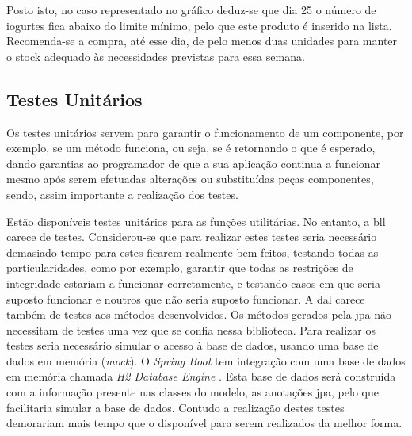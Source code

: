 Posto isto, no caso representado no gráfico deduz-se que dia 25 o número de iogurtes fica abaixo do limite mínimo, pelo que este produto é inserido na lista. Recomenda-se a compra, até esse dia, de pelo menos duas unidades para manter o stock adequado às necessidades previstas para essa semana.



\subsection{Testes Unitários}\label{subsec354}

Os testes unitários servem para garantir o funcionamento de um componente, por exemplo, se um método funciona, ou seja,  se é retornando o que é esperado, dando garantias ao programador de que a sua aplicação continua a funcionar mesmo após serem efetuadas alterações ou substituídas peças componentes, sendo, assim importante a realização dos testes. 

Estão disponíveis testes unitários para as funções utilitárias. No entanto, a \acrfull{bll} carece de testes. Considerou-se que para realizar estes testes seria necessário demasiado tempo para estes ficarem realmente bem feitos, testando todas as particularidades, como por exemplo, garantir que todas as restrições de integridade estariam a funcionar corretamente, e testando casos em que seria suposto funcionar e noutros que não seria suposto funcionar. A \acrfull{dal} carece também de testes aos métodos desenvolvidos. Os métodos gerados pela \acrshort{jpa} não necessitam de testes uma vez que se confia nessa biblioteca. Para realizar os testes seria necessário simular o acesso à base de dados, usando uma base de dados em memória (\textit{mock}). O \textit{Spring Boot} tem integração com uma base de dados em memória chamada \textit{H2 Database Engine} \cite{H2DatabaseEngine:database}. Esta base de dados será construída com a informação presente nas classes do modelo, as anotações \acrshort{jpa}, pelo que facilitaria simular a base de dados. Contudo a realização destes testes demorariam mais tempo que o disponível para serem realizados da melhor forma.